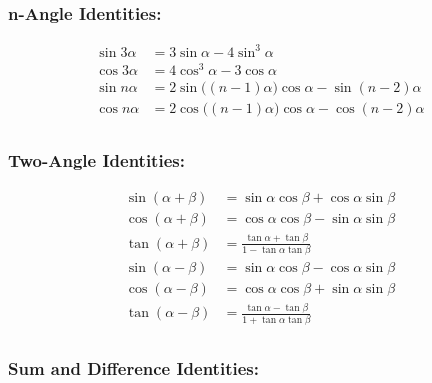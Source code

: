 \documentclass[
]{book}
\begin{document}
\hypertarget{n-angle-identities}{%
\subsubsection*{n-Angle Identities:}\label{n-angle-identities}}

\begin{align}
\sin{3\alpha} &= 3\sin{\alpha} - 4\sin^3{\alpha}\\
\cos{3\alpha} &= 4\cos^3{\alpha} - 3\cos{\alpha}\\
\sin{n\alpha} &= 2\sin\big(\left(n-1\right)\alpha\big) \cos{\alpha} - \sin(n-2)\alpha\\
\cos{n\alpha} &= 2\cos\big(\left(n-1\right)\alpha\big) \cos{\alpha} - \cos\left(n-2\right)\alpha\\
\end{align}

\hypertarget{two-angle-identities}{%
\subsubsection*{Two-Angle Identities:}\label{two-angle-identities}}

\begin{align}
\sin\left(\alpha + \beta\right) &= \sin{\alpha}\cos{\beta} + \cos{\alpha}\sin{\beta}\\
\cos\left(\alpha + \beta\right) &= \cos{\alpha}\cos{\beta} - \sin{\alpha}\sin{\beta}\\
\tan\left(\alpha + \beta\right) &= \frac{\tan{\alpha} + \tan{\beta}}{1 - \tan{\alpha}\tan{\beta}}\\
\sin\left(\alpha - \beta\right) &= \sin{\alpha}\cos{\beta} - \cos{\alpha}\sin{\beta}\\
\cos\left(\alpha - \beta\right) &= \cos{\alpha}\cos{\beta} + \sin{\alpha}\sin{\beta}\\
\tan\left(\alpha - \beta\right) &= \frac{\tan{\alpha} - \tan{\beta}}{1 + \tan{\alpha}\tan{\beta}}\\
\end{align}

\hypertarget{sum-and-difference-identities}{%
\subsubsection*{Sum and Difference Identities:}\label{sum-and-difference-identities}}
\end{document}
